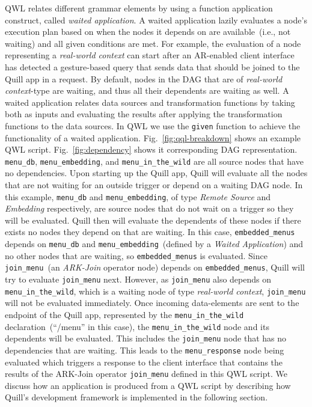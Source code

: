 \documentclass[11pt]{article}
\begin{document}
QWL relates different grammar elements by using a function application construct, called \emph{waited application}. A waited application lazily evaluates a node's execution plan based on when the nodes it depends on are available~(i.e., not waiting) and all given conditions are met. For example, the evaluation of a node representing a \textit{real-world context} can start after an AR-enabled client interface has detected a gesture-based query that sends data that should be joined to the Quill app in a request. By default, nodes in the DAG that are of \emph{real-world context}-type are waiting, and thus all their dependents are waiting as well. A waited application relates data sources and transformation functions by taking both as inputs and evaluating the results after applying the transformation functions to the data sources. In QWL we use the \texttt{given} function to achieve the functionality of a waited application. Fig.~\ref{fig:qql-breakdown} shows an example QWL script. Fig.~\ref{fig:dependency} shows it corresponding DAG representation. \texttt{menu\_db}, \texttt{menu\_embedding}, and \texttt{menu\_in\_the\_wild} are all source nodes that have no dependencies.
Upon starting up the Quill app, Quill will evaluate all the nodes that are not waiting for an outside trigger or depend on a waiting DAG node. In this example, \texttt{menu\_db} and \texttt{menu\_embedding}, of type \emph{Remote Source} and \emph{Embedding} respectively, are source nodes that do not wait on a trigger so they will be evaluated.
Quill then will evaluate the dependents of these nodes if there exists no nodes they depend on that are waiting. In this case, \texttt{embedded\_menus} depends on \texttt{menu\_db} and \texttt{menu\_embedding}~(defined by a \emph{Waited Application}) and no other nodes that are waiting, so \texttt{embedded\_menus} is evaluated.
Since \texttt{join\_menu}~(an \emph{ARK-Join} operator node) depends on \texttt{embedded\_menus}, Quill will try to evaluate \texttt{join\_menu} next.
However, as \texttt{join\_menu} also depends on \texttt{menu\_in\_the\_wild}, which is a waiting node of type \emph{real-world context}, \texttt{join\_menu} will not be evaluated immediately. Once incoming data-elements are sent to the endpoint of the Quill app, represented by the \texttt{menu\_in\_the\_wild} declaration~(``/menu'' in this case), the \texttt{menu\_in\_the\_wild} node and its dependents will be evaluated. This includes the \texttt{join\_menu} node that has no dependencies that are waiting. This leads to the \texttt{menu\_response} node being evaluated which triggers a response to the client interface that contains the results of the ARK-Join operator \texttt{join\_menu} defined in this QWL script. We discuss how an application is produced from a QWL script by describing how Quill's development framework is implemented in the following section.
\end{document}
